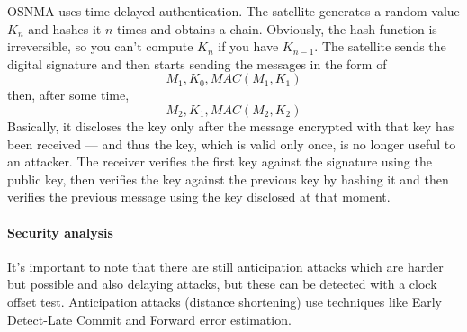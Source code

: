 OSNMA uses time-delayed authentication. The satellite generates a random value $K_n$ and hashes it $n$ times and obtains a chain. Obviously, the hash function is irreversible, so you can't compute $K_n$ if you have $K_{n-1}$.
The satellite sends the digital signature and then starts sending the messages in the form of \[ M_1, K_0,MAC(M_1, K_1)\] then, after some time, \[ M_2, K_1,MAC(M_2, K_2)\]
Basically, it discloses the key only after the message encrypted with that key has been received --- and thus the key, which is valid only once, is no longer useful to an attacker.
The receiver verifies the first key against the signature using the public key, then verifies the key against the previous key by hashing it and then verifies the previous message using the key disclosed at that moment.

\paragraph{Security analysis}
It's important to note that there are still anticipation attacks which are harder but possible and also delaying attacks, but these can be detected with a clock offset test.
Anticipation attacks (distance shortening) use techniques like Early Detect-Late Commit and Forward error estimation.
